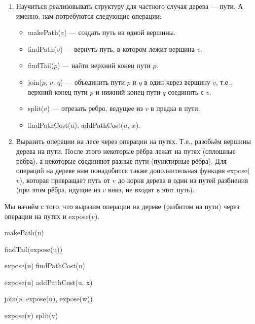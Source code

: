 \begin{enumerate}
    \item Научиться реализовывать структуру для частного случая дерева --- пути. А именно, нам потребуются следующие операции:
        \begin{itemize}
            \item makePath($v$) --- создать путь из одной вершины.
            \item findPath($v$) --- вернуть путь, в котором лежит вершина $v$.
            \item findTail($p$) --- найти верхний конец пути $p$.
            \item join($p$, $v$, $q$) --- объединить пути $p$ и $q$ в один через вершину $v$, т.е., верхний конец пути $p$ и нижний конец пути $q$ соединить с $v$.
            \item split($v$) --- отрезать ребро, ведущее из $v$ в предка в пути.
            \item findPathCost($u$), addPathCost($u$, $x$).
        \end{itemize}
    \item Выразить операции на лесе через операции на путях. Т.е., разобьём вершины дерева на пути. После этого некоторые рёбра лежат на путях (сплошные рёбра), а некоторые соединяют разные пути (пунктирные рёбра). Для операций на дереве нам понадобится также дополнительная функция expose($v$), которая превращает путь от $v$ до корня дерева в один из путей разбиения (при этом рёбра, идущие из $v$ вниз, не входят в этот путь).
\end{enumerate}

Мы начнём с того, что выразим операции на дереве (разбитом на пути) через операции на путях и expose($v$).

\begin{algorithmic}[1]
		\State makePath(u)
    \EndProcedure
    
		\State findTail(expose(u))
    \EndProcedure
    
        \State expose(u)
		\State findPathCost(u)
    \EndProcedure
    
        \State expose(u)
		\State addPathCost(u, x)
    \EndProcedure
    
		\State join(\o, expose(u), expose(w))
    \EndProcedure
    
		\State expose(v)
		\State split(v)
    \EndProcedure
	
\end{algorithmic}

